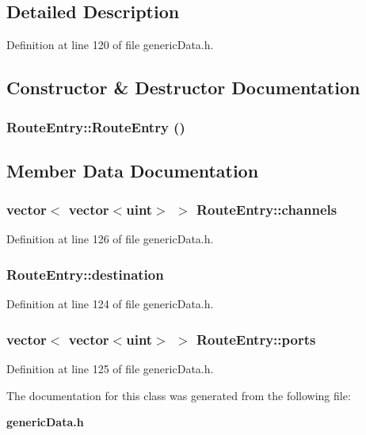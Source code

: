 \subsection{Detailed Description}


Definition at line 120 of file genericData.h.

\subsection{Constructor \& Destructor Documentation}
\subsubsection[{RouteEntry}]{\setlength{\rightskip}{0pt plus 5cm}RouteEntry::RouteEntry ()}\label{classRouteEntry_2823cc34016bfd3b831ca8a9e15d19af}




\subsection{Member Data Documentation}
\subsubsection[{channels}]{\setlength{\rightskip}{0pt plus 5cm}vector$<$ vector$<${\bf uint}$>$ $>$ {\bf RouteEntry::channels}}\label{classRouteEntry_6c9fae93cc05b19c9cfeb8667052287d}




Definition at line 126 of file genericData.h.
\subsubsection[{destination}]{ {\bf RouteEntry::destination}}\label{classRouteEntry_470e2ba2804fa9bc03f346c6affbc81b}




Definition at line 124 of file genericData.h.
\subsubsection[{ports}]{\setlength{\rightskip}{0pt plus 5cm}vector$<$ vector$<${\bf uint}$>$ $>$ {\bf RouteEntry::ports}}\label{classRouteEntry_b896dd714e62355689e4a94ff84f8c10}




Definition at line 125 of file genericData.h.

The documentation for this class was generated from the following file:\begin{CompactItemize}
\item 
{\bf genericData.h}\end{CompactItemize}
